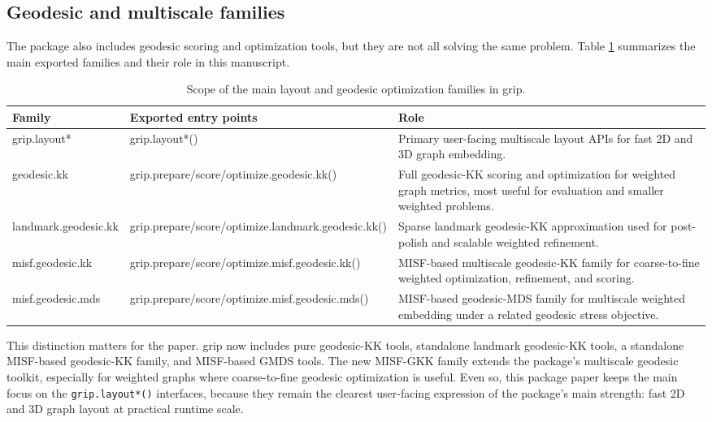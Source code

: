 \subsection{Geodesic and multiscale families}\label{geodesic-and-multiscale-families}

The package also includes geodesic scoring and optimization tools, but they are
not all solving the same problem. Table \ref{tab:family-scope} summarizes the
main exported families and their role in this manuscript.

\begin{table}

\caption{\label{tab:family-scope}Scope of the main layout and geodesic optimization families in grip.}
\centering
\begin{tabular}[t]{l|l|l}
\hline
Family & Exported entry points & Role\\
\hline
grip.layout* & grip.layout*() & Primary user-facing multiscale layout APIs for fast 2D and 3D graph embedding.\\
\hline
geodesic.kk & grip.prepare/score/optimize.geodesic.kk() & Full geodesic-KK scoring and optimization for weighted graph metrics, most useful for evaluation and smaller weighted problems.\\
\hline
landmark.geodesic.kk & grip.prepare/score/optimize.landmark.geodesic.kk() & Sparse landmark geodesic-KK approximation used for post-polish and scalable weighted refinement.\\
\hline
misf.geodesic.kk & grip.prepare/score/optimize.misf.geodesic.kk() & MISF-based multiscale geodesic-KK family for coarse-to-fine weighted optimization, refinement, and scoring.\\
\hline
misf.geodesic.mds & grip.prepare/score/optimize.misf.geodesic.mds() & MISF-based geodesic-MDS family for multiscale weighted embedding under a related geodesic stress objective.\\
\hline
\end{tabular}
\end{table}

This distinction matters for the paper. grip now includes pure geodesic-KK
tools, standalone landmark geodesic-KK tools, a standalone MISF-based
geodesic-KK family, and MISF-based GMDS tools. The new MISF-GKK family extends
the package's multiscale geodesic toolkit, especially for weighted graphs where
coarse-to-fine geodesic optimization is useful. Even so, this package paper
keeps the main focus on the \texttt{grip.layout*()} interfaces, because they remain
the clearest user-facing expression of the package's main strength: fast 2D and
3D graph layout at practical runtime scale.

